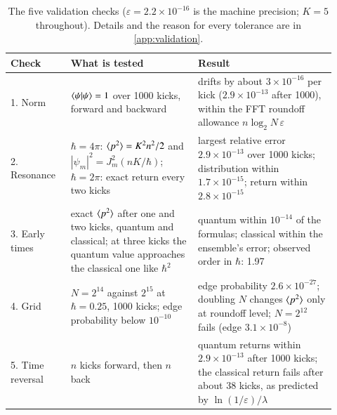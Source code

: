 \begin{table}[!htbp]
\centering
\small
\begin{tabular}{@{}>{\raggedright}p{0.17\linewidth}>{\raggedright}p{0.36\linewidth}>{\raggedright\arraybackslash}p{0.39\linewidth}@{}}
\toprule
Check & What is tested & Result \\
\midrule
1. Norm & $\langle \psi|\psi \rangle = 1$ over 1000 kicks, forward and backward & drifts by about $3\times10^{-16}$ per kick
  ($2.9\times10^{-13}$ after 1000), within the FFT roundoff allowance $n\log_2 N\,\varepsilon$ \\
2. Resonance & $\hbar = 4\pi$: $\langle p^2 \rangle = K^2n^2/2$ and $|\psi_m|^2 = J_m^2(nK/\hbar)$;
  $\hbar = 2\pi$: exact return every two kicks & largest relative error $2.9\times10^{-13}$ over 1000 kicks;
  distribution within $1.7\times10^{-15}$; return within $2.8\times10^{-15}$ \\
3. Early times & exact $\langle p^2 \rangle$ after one and two kicks, quantum and classical; at three kicks the quantum
  value approaches the classical one like $\hbar^2$ & quantum within $10^{-14}$ of the formulas; classical
  within the ensemble's error; observed order in $\hbar$: 1.97 \\
4. Grid & $N = 2^{14}$ against $2^{15}$ at $\hbar = 0.25$, 1000 kicks; edge probability below $10^{-10}$ &
  edge probability $2.6\times10^{-27}$; doubling $N$ changes $\langle p^2 \rangle$ only at roundoff level; $N = 2^{12}$
  fails (edge $3.1\times10^{-8}$) \\
5. Time reversal & $n$ kicks forward, then $n$ back & quantum returns within $2.9\times10^{-13}$ after 1000
  kicks; the classical return fails after about 38 kicks, as predicted by $\ln(1/\varepsilon)/\lambda$ \\
\bottomrule
\end{tabular}
\caption{The five validation checks ($\varepsilon = 2.2\times10^{-16}$ is the machine precision; $K = 5$
throughout). Details and the reason for every tolerance are in \cref{app:validation}.}
\label{tab:validation}
\end{table}
